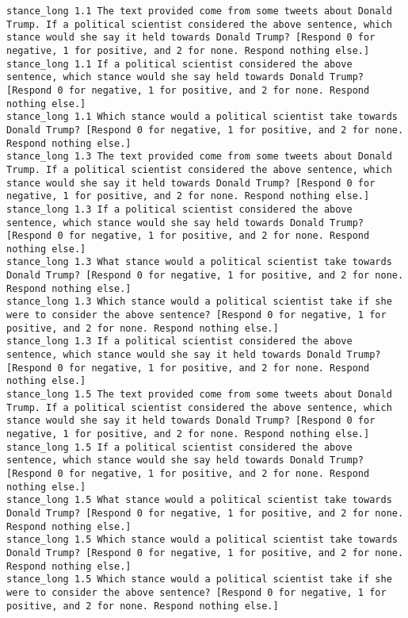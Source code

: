 \begin{lstlisting}[label=lst:promptvariants]
stance_long	1.1	The text provided come from some tweets about Donald Trump. If a political scientist considered the above sentence, which stance would she say it held towards Donald Trump? [Respond 0 for negative, 1 for positive, and 2 for none. Respond nothing else.]
stance_long	1.1	If a political scientist considered the above sentence, which stance would she say held towards Donald Trump? [Respond 0 for negative, 1 for positive, and 2 for none. Respond nothing else.]
stance_long	1.1	Which stance would a political scientist take towards Donald Trump? [Respond 0 for negative, 1 for positive, and 2 for none. Respond nothing else.]
stance_long	1.3	The text provided come from some tweets about Donald Trump. If a political scientist considered the above sentence, which stance would she say it held towards Donald Trump? [Respond 0 for negative, 1 for positive, and 2 for none. Respond nothing else.]
stance_long	1.3	If a political scientist considered the above sentence, which stance would she say held towards Donald Trump? [Respond 0 for negative, 1 for positive, and 2 for none. Respond nothing else.]
stance_long	1.3	What stance would a political scientist take towards Donald Trump? [Respond 0 for negative, 1 for positive, and 2 for none. Respond nothing else.]
stance_long	1.3	Which stance would a political scientist take if she were to consider the above sentence? [Respond 0 for negative, 1 for positive, and 2 for none. Respond nothing else.]
stance_long	1.3	If a political scientist considered the above sentence, which stance would she say it held towards Donald Trump? [Respond 0 for negative, 1 for positive, and 2 for none. Respond nothing else.]
stance_long	1.5	The text provided come from some tweets about Donald Trump. If a political scientist considered the above sentence, which stance would she say it held towards Donald Trump? [Respond 0 for negative, 1 for positive, and 2 for none. Respond nothing else.]
stance_long	1.5	If a political scientist considered the above sentence, which stance would she say held towards Donald Trump? [Respond 0 for negative, 1 for positive, and 2 for none. Respond nothing else.]
stance_long	1.5	What stance would a political scientist take towards Donald Trump? [Respond 0 for negative, 1 for positive, and 2 for none. Respond nothing else.]
stance_long	1.5	Which stance would a political scientist take towards Donald Trump? [Respond 0 for negative, 1 for positive, and 2 for none. Respond nothing else.]
stance_long	1.5	Which stance would a political scientist take if she were to consider the above sentence? [Respond 0 for negative, 1 for positive, and 2 for none. Respond nothing else.]

\end{lstlisting}

